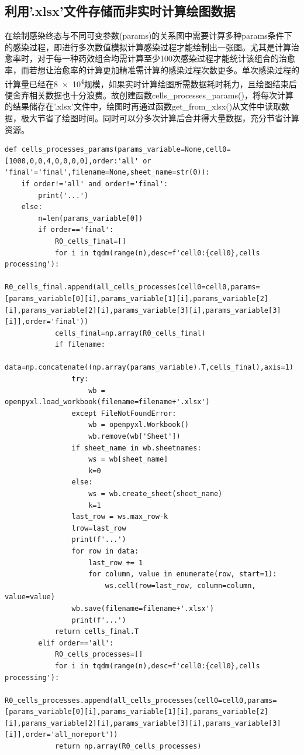\documentclass{ctexart}
\begin{document}
\subsection{利用'.xlsx'文件存储而非实时计算绘图数据}
在绘制感染终态与不同可变参数(params)的关系图中需要计算多种params条件下的感染过程，即进行多次数值模拟计算感染过程才能绘制出一张图。尤其是计算治愈率时，对于每一种药效组合均需计算至少100次感染过程才能统计该组合的治愈率，而若想让治愈率的计算更加精准需计算的感染过程次数更多。单次感染过程的计算量已经在\num{8e4}规模，如果实时计算绘图所需数据耗时耗力，且绘图结束后便舍弃相关数据也十分浪费。故创建函数cells\_processes\_params()，将每次计算的结果储存在'.xlsx'文件中，绘图时再通过函数get\_from\_xlsx()从文件中读取数据，极大节省了绘图时间。同时可以分多次计算后合并得大量数据，充分节省计算资源。
\begin{lstlisting}[label={lst.7}, caption={生成感染终态数据并在'.xlsx'文件中存读}]
    def cells_processes_params(params_variable=None,cell0=[1000,0,0,4,0,0,0,0],order:'all' or 'final'='final',filename=None,sheet_name=str(0)):
    if order!='all' and order!='final':
        print('...')
    else:
        n=len(params_variable[0])
        if order=='final':
            R0_cells_final=[]
            for i in tqdm(range(n),desc=f'cell0:{cell0},cells processing'):
                R0_cells_final.append(all_cells_processes(cell0=cell0,params=[params_variable[0][i],params_variable[1][i],params_variable[2][i],params_variable[2][i],params_variable[3][i],params_variable[3][i]],order='final'))
            cells_final=np.array(R0_cells_final)
            if filename:
                data=np.concatenate((np.array(params_variable).T,cells_final),axis=1)
                try:
                    wb = openpyxl.load_workbook(filename=filename+'.xlsx')
                except FileNotFoundError:
                    wb = openpyxl.Workbook()
                    wb.remove(wb['Sheet'])
                if sheet_name in wb.sheetnames:
                    ws = wb[sheet_name]
                    k=0
                else:
                    ws = wb.create_sheet(sheet_name)
                    k=1
                last_row = ws.max_row-k
                lrow=last_row
                print(f'...')
                for row in data:
                    last_row += 1
                    for column, value in enumerate(row, start=1):
                        ws.cell(row=last_row, column=column, value=value)
                wb.save(filename=filename+'.xlsx')
                print(f'...')
            return cells_final.T
        elif order=='all':
            R0_cells_processes=[]
            for i in tqdm(range(n),desc=f'cell0:{cell0},cells processing'):
                R0_cells_processes.append(all_cells_processes(cell0=cell0,params=[params_variable[0][i],params_variable[1][i],params_variable[2][i],params_variable[2][i],params_variable[3][i],params_variable[3][i]],order='all_noreport'))
            return np.array(R0_cells_processes)


\end{lstlisting}
\end{document}

